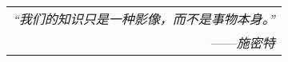 \begin{flushright}
    \begin{tabular}{r||}
        \textit{“我们的知识只是一种影像，而不是事物本身。”}\\
        ——\textit{施密特}
    \end{tabular}
\end{flushright}
